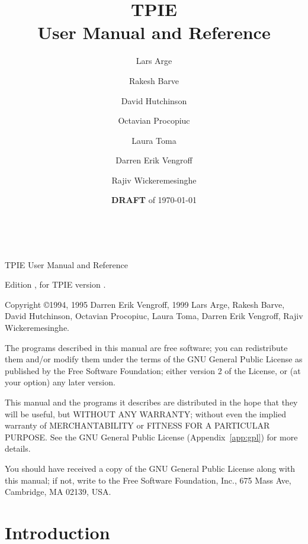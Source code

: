 





\title{{\Huge TPIE}\\ User Manual and Reference}
\author{Lars Arge \and Rakesh Barve \and David Hutchinson \and Octavian Procopiuc \and Laura
Toma\and  Darren Erik Vengroff \and Rajiv Wickeremesinghe}
\date{{\bf DRAFT} of \today}

\maketitle

\begin{titlepage}

\mbox{ }

\vspace{\fill}


\noindent TPIE User Manual and Reference

\noindent Edition \edition, for TPIE version \version.

\vspace{2 ex}

\noindent Copyright \copyright 1994, 1995 Darren Erik Vengroff, 1999 Lars
Arge, Rakesh Barve, David Hutchinson, Octavian Procopiuc, Laura Toma, Darren Erik
Vengroff, Rajiv Wickeremesinghe.

\vspace{2 ex}

The programs described in this manual are free software; you can
redistribute them and/or modify them under the terms of the GNU General
Public License as published by the Free Software Foundation; either
version 2 of the License, or (at your option) any later version.

This manual and the programs it describes are distributed in the hope
that they will be useful, but WITHOUT ANY WARRANTY; without even the
implied warranty of MERCHANTABILITY or FITNESS FOR A PARTICULAR
PURPOSE.  See the GNU General Public License (Appendix~\ref{app:gpl})
for more details.

You should have received a copy of the GNU General Public License
along with this manual; if not, write to the Free Software Foundation,
Inc., 675 Mass Ave, Cambridge, MA 02139, USA.
\end{titlepage}

\tableofcontents

\chapter*{Introduction}

